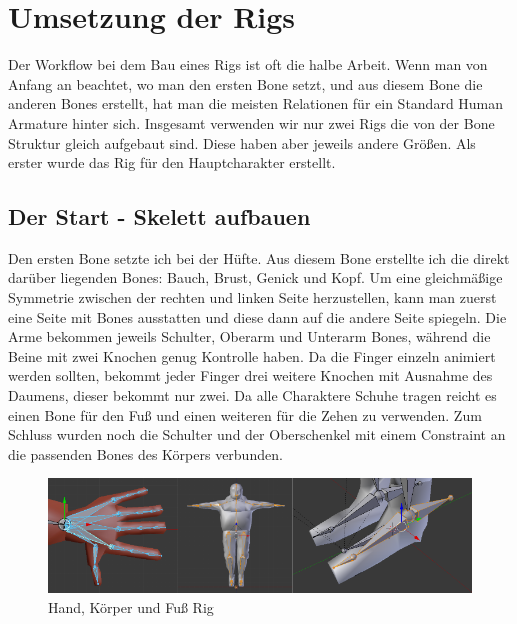 \section{Umsetzung der Rigs}
Der Workflow bei dem Bau eines Rigs ist oft die halbe Arbeit. Wenn man von Anfang an beachtet,
wo man den ersten Bone setzt, und aus diesem Bone die anderen Bones erstellt, hat man die meisten Relationen für ein Standard Human Armature hinter sich.
Insgesamt verwenden wir nur zwei Rigs die von der Bone Struktur gleich aufgebaut sind.
Diese haben aber jeweils andere Größen. Als erster wurde das Rig für den Hauptcharakter erstellt.

\subsection{Der Start - Skelett aufbauen}
Den ersten Bone setzte ich bei der Hüfte. Aus diesem Bone erstellte ich die direkt darüber liegenden Bones: Bauch, Brust, Genick und Kopf.
Um eine gleichmäßige Symmetrie zwischen der rechten und linken Seite herzustellen, kann man zuerst eine Seite mit Bones ausstatten und diese dann auf die andere Seite spiegeln.
Die Arme bekommen jeweils Schulter, Oberarm und Unterarm Bones, während die Beine mit zwei Knochen genug Kontrolle haben. Da die Finger einzeln animiert werden sollten,
bekommt jeder Finger drei weitere Knochen mit Ausnahme des Daumens, dieser bekommt nur zwei. Da alle Charaktere Schuhe tragen reicht es einen Bone für den Fuß und einen weiteren
für die Zehen zu verwenden.
Zum Schluss wurden noch die Schulter und der Oberschenkel mit einem Constraint an die passenden Bones des Körpers verbunden.

\begin{figure}[H]
    \centering

    \includegraphics[width=.8\textwidth]{images/rigging_umsetzung.png}
    \caption{Hand, Körper und Fuß Rig}
\end{figure}


